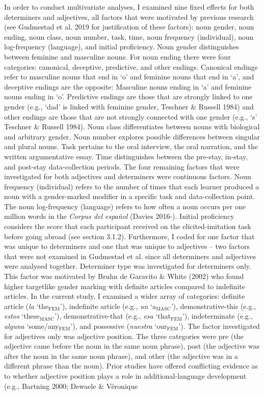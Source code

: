 \documentclass[12pt]{article}
\newcommand\textsubscript[1]{\ensuremath{{}_{\text{#1}}}}
\newenvironment{styleNoSpacing}{\setlength\leftskip{0cm}\setlength\rightskip{0cm plus 1fil}\setlength\parindent{0cm}\setlength\parfillskip{0pt plus 1fil}\setlength\parskip{0cm plus 1pt}\writerlistparindent\writerlistleftskip\leavevmode\normalfont\normalsize\fontsize{11pt}{13.2pt}\selectfont\writerlistlabel\ignorespaces}{\unskip\vspace{0cm plus 1pt}\par}
\newcommand\writerlistleftskip{}
\newcommand\writerlistparindent{}
\newcommand\writerlistlabel{}
\begin{document}
\begin{styleNoSpacing}
In order to conduct multivariate analyses, I examined nine fixed effects for both determiners and adjectives, all factors that were motivated by previous research (see Gudmestad et al. 2019 for justification of these factors): noun gender, noun ending, noun class, noun number, task, time, noun frequency (individual), noun log-frequency (language), and initial proficiency. Noun gender distinguishes between feminine and masculine nouns. For noun ending there were four categories: canonical, deceptive, predictive, and other endings. Canonical endings refer to masculine nouns that end in ‘o’ and feminine nouns that end in ‘a’, and deceptive endings are the opposite: Masculine nouns ending in ‘a’ and feminine nouns ending in ‘o’. Predictive endings are those that are strongly linked to one gender (e.g., ‘dad’ is linked with feminine gender, Teschner \& Russell 1984) and other endings are those that are not strongly connected with one gender (e.g., ‘s’ Teschner \& Russell 1984). Noun class differentiates between nouns with biological and arbitrary gender. Noun number explores possible differences between singular and plural nouns. Task pertains to the oral interview, the oral narration, and the written argumentative essay. Time distinguishes between the pre-stay, in-stay, and post-stay data-collection periods. The four remaining factors that were investigated for both adjectives and determiners were continuous factors. Noun frequency (individual) refers to the number of times that each learner produced a noun with a gender-marked modifier in a specific task and data-collection point. The noun log-frequency (language) refers to how often a noun occurs per one million words in the \textit{Corpus del español} (Davies 2016-). Initial proficiency considers the score that each participant received on the elicited-imitation task before going abroad (see section 3.1.2). Furthermore, I coded for one factor that was unique to determiners and one that was unique to adjectives – two factors that were not examined in Gudmestad et al. since all determiners and adjectives were analysed together. Determiner type was investigated for determiners only. This factor was motivated by Bruhn de Garavito \& White (2002) who found higher targetlike gender marking with definite articles compared to indefinite articles. In the current study, I examined a wider array of categories: definite article (\textit{la} ‘the\textsubscript{FEM}’), indefinite article (e.g., \textit{un }‘a\textsubscript{MASC}’), demonstrative-this (e.g., \textit{estos }‘these\textsubscript{MASC}’), demonstrative-that (e.g., \textit{esa} ‘that\textsubscript{FEM}’), indeterminate (e.g., \textit{alguna }‘some/any\textsubscript{FEM}’), and possessive (\textit{nuestra }‘our\textsubscript{FEM}’). The factor investigated for adjectives only was adjective position. The three categories were pre (the adjective came before the noun in the same noun phrase), post (the adjective was after the noun in the same noun phrase), and other (the adjective was in a different phrase than the noun). Prior studies have offered conflicting evidence as to whether adjective position plays a role in additional-language development (e.g., Bartning 2000; Dewaele \& Véronique 
\end{styleNoSpacing}
\end{document}
